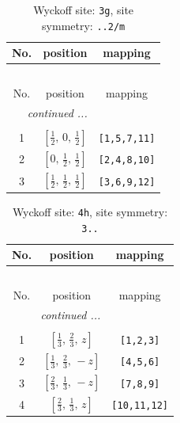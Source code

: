 \documentclass[fleqn,8pt]{jsarticle}
\begin{document}
\begin{longtable}{ccc}
\caption{Wyckoff site: {\tt 3g}, site symmetry: {\tt ..2/m}}
 \\
 \hline \hline
No. & position & mapping \\ \hline \endfirsthead

\multicolumn{2}{l}{\tablename\ \thetable{}} \\
 \hline \hline
No. & position & mapping \\ \hline \endhead

 \hline \hline
\multicolumn{2}{r}{\footnotesize\it continued ...} \\ \endfoot

 \hline \hline
\multicolumn{2}{r}{} \\ \endlastfoot

1 & $\left[ \frac{1}{2},\, 0,\, \frac{1}{2} \right]$ & {\tt [1,5,7,11]} \\ \hline
2 & $\left[ 0,\, \frac{1}{2},\, \frac{1}{2} \right]$ & {\tt [2,4,8,10]} \\ \hline
3 & $\left[ \frac{1}{2},\, \frac{1}{2},\, \frac{1}{2} \right]$ & {\tt [3,6,9,12]} \\
\end{longtable}
\renewcommand{\arraystretch}{1.2}
\begin{longtable}{ccc}
\caption{Wyckoff site: {\tt 4h}, site symmetry: {\tt 3..}}
 \\
 \hline \hline
No. & position & mapping \\ \hline \endfirsthead

\multicolumn{2}{l}{\tablename\ \thetable{}} \\
 \hline \hline
No. & position & mapping \\ \hline \endhead

 \hline \hline
\multicolumn{2}{r}{\footnotesize\it continued ...} \\ \endfoot

 \hline \hline
\multicolumn{2}{r}{} \\ \endlastfoot

1 & $\left[ \frac{1}{3},\, \frac{2}{3},\, z \right]$ & {\tt [1,2,3]} \\ \hline
2 & $\left[ \frac{1}{3},\, \frac{2}{3},\, - z \right]$ & {\tt [4,5,6]} \\ \hline
3 & $\left[ \frac{2}{3},\, \frac{1}{3},\, - z \right]$ & {\tt [7,8,9]} \\ \hline
4 & $\left[ \frac{2}{3},\, \frac{1}{3},\, z \right]$ & {\tt [10,11,12]} \\
\end{longtable}
\end{document}
